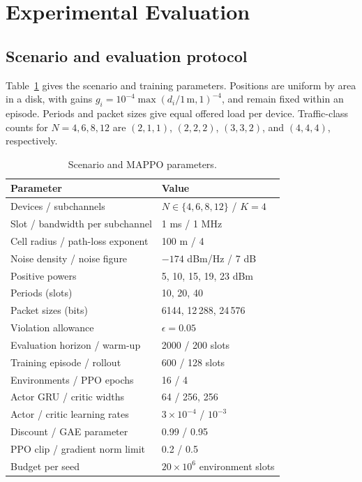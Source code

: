 \section{Experimental Evaluation}\label{sec:experiments}
\subsection{Scenario and evaluation protocol}
Table~\ref{tab:parameters} gives the scenario and training parameters.
Positions are uniform by area in a disk, with gains
$g_i=10^{-4}\max(d_i/1\,\mathrm{m},1)^{-4}$, and remain fixed within
an episode. Periods and packet sizes give equal offered load per device.
Traffic-class counts for $N=4,6,8,12$ are $(2,1,1)$, $(2,2,2)$,
$(3,3,2)$, and $(4,4,4)$, respectively.

\begin{table}[t]
\caption{Scenario and MAPPO parameters.}\label{tab:parameters}
\centering\footnotesize
\begin{tabular}{ll}
\toprule
Parameter & Value \\
\midrule
Devices / subchannels & $N\in\{4,6,8,12\}$ / $K=4$ \\
Slot / bandwidth per subchannel & 1 ms / 1 MHz \\
Cell radius / path-loss exponent & 100 m / 4 \\
Noise density / noise figure & $-174$ dBm/Hz / 7 dB \\
Positive powers & 5, 10, 15, 19, 23 dBm \\
Periods (slots) & 10, 20, 40 \\
Packet sizes (bits) & 6144, 12\,288, 24\,576 \\
Violation allowance & $\epsilon=0.05$ \\
Evaluation horizon / warm-up & 2000 / 200 slots \\
Training episode / rollout & 600 / 128 slots \\
Environments / PPO epochs & 16 / 4 \\
Actor GRU / critic widths & 64 / 256, 256 \\
Actor / critic learning rates & $3\!\times\!10^{-4}$ / $10^{-3}$ \\
Discount / GAE parameter & 0.99 / 0.95 \\
PPO clip / gradient norm limit & 0.2 / 0.5 \\
Budget per seed & $20\!\times\!10^6$ environment slots \\
\bottomrule
\end{tabular}
\end{table}


